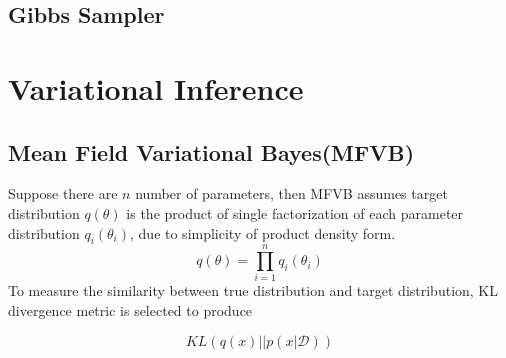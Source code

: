 \subsection{Gibbs Sampler}

\section{Variational Inference}
\label{VI}

\subsection{Mean Field Variational Bayes(MFVB)}
Suppose there are $n$ number of parameters, then MFVB assumes target distribution $q(\theta)$ is the product of single factorization of each parameter distribution $q_i(\theta_i)$, due to simplicity of product density form. 
\begin{equation}
	q(\theta) = \prod_{i=1}^{n} q_i(\theta_i)
\end{equation}
To measure the similarity between true distribution and target distribution, KL divergence metric is selected to produce

\begin{equation}
	KL(q(x)||p(x|\mathcal{D})) 
\end{equation}







